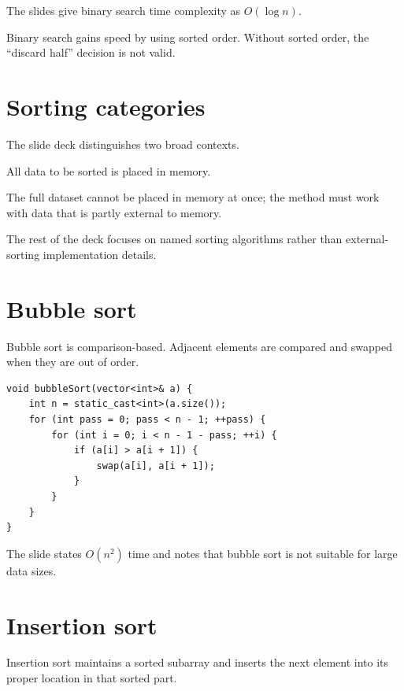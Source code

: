 The slides give binary search time complexity as $O(\log n)$.

\begin{keyidea}
Binary search gains speed by using sorted order. Without sorted order, the ``discard half'' decision is not valid.
\end{keyidea}

\section{Sorting categories}

The slide deck distinguishes two broad contexts.

\begin{description}[leftmargin=1.35in,style=nextline]
  \item[Internal sorting] All data to be sorted is placed in memory.
  \item[External sorting] The full dataset cannot be placed in memory at once; the method must work with data that is partly external to memory.
\end{description}

The rest of the deck focuses on named sorting algorithms rather than external-sorting implementation details.

\section{Bubble sort}

Bubble sort is comparison-based. Adjacent elements are compared and swapped when they are out of order.

\begin{lstlisting}
void bubbleSort(vector<int>& a) {
    int n = static_cast<int>(a.size());
    for (int pass = 0; pass < n - 1; ++pass) {
        for (int i = 0; i < n - 1 - pass; ++i) {
            if (a[i] > a[i + 1]) {
                swap(a[i], a[i + 1]);
            }
        }
    }
}
\end{lstlisting}

The slide states $O(n^2)$ time and notes that bubble sort is not suitable for large data sizes.

\section{Insertion sort}

Insertion sort maintains a sorted subarray and inserts the next element into its proper location in that sorted part.

